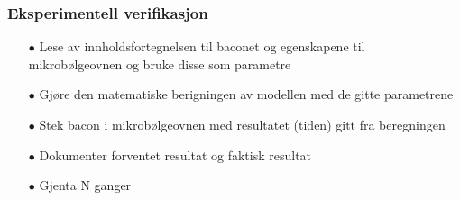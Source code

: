 \documentclass[screen]{beamer}
\begin{document}
\begin{frame}
  \frametitle{Eksperimentell verifikasjon}
  \begin{itemize}
	\item[$\bullet$] Lese av innholdsfortegnelsen til baconet og egenskapene til mikrobølgeovnen
	og bruke disse som parametre
	\item[$\bullet$] Gjøre den matematiske berigningen av modellen med de gitte parametrene
	\item[$\bullet$] Stek bacon i mikrobølgeovnen med resultatet (tiden) gitt fra beregningen
	\item[$\bullet$] Dokumenter forventet resultat og faktisk resultat
	\item[$\bullet$] Gjenta N ganger
  \end{itemize}
\end{frame}
\end{document}
